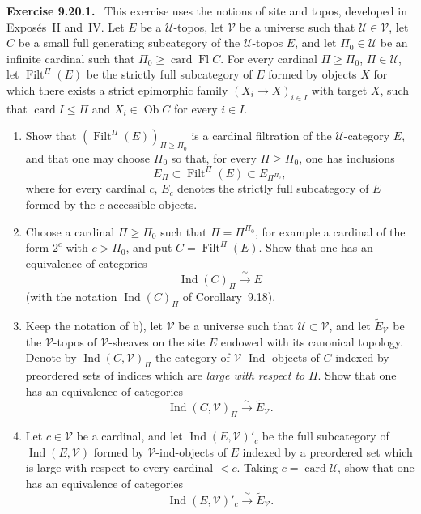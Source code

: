 \documentclass[11pt]{article}
\newcommand{\U}{\mathcal{U}}
\newcommand{\V}{\mathcal{V}}
\newcommand{\Ob}{\operatorname{Ob}}
\newcommand{\Ind}{\operatorname{Ind}}
\newcommand{\Filt}{\operatorname{Filt}}
\newcommand{\card}{\operatorname{card}}
\newcommand{\Fl}{\operatorname{Fl}}
\newenvironment{statement}[1]{\par\medskip\noindent\textbf{#1.}\ }{\par\medskip}
\begin{document}
\begin{statement}{Exercise 9.20.1}
This exercise uses the notions of site and topos, developed in Expos\'es~II and~IV. Let $E$ be a $\U$-topos, let $\V$ be a universe such that $\U\in\V$, let $C$ be a small full generating subcategory of the $\U$-topos $E$, and let $\Pi_0\in\U$ be an infinite cardinal such that $\Pi_0\geq\card \Fl C$. For every cardinal $\Pi\geq\Pi_0$, $\Pi\in\U$, let $\Filt^\Pi(E)$ be the strictly full subcategory of $E$ formed by objects $X$ for which there exists a strict epimorphic family $(X_i\to X)_{i\in I}$ with target $X$, such that $\card I\leq\Pi$ and $X_i\in\Ob C$ for every $i\in I$.
\begin{enumerate}[label=\alph*)]
\item Show that $(\Filt^\Pi(E))_{\Pi\geq\Pi_0}$ is a cardinal filtration of the $\U$-category $E$, and that one may choose $\Pi_0$ so that, for every $\Pi\geq\Pi_0$, one has inclusions
\[
 E_\Pi\subset \Filt^\Pi(E)\subset E_{\Pi^{\Pi_0}},
\]
where for every cardinal $c$, $E_c$ denotes the strictly full subcategory of $E$ formed by the $c$-accessible objects.

\item Choose a cardinal $\Pi\geq\Pi_0$ such that $\Pi=\Pi^{\Pi_0}$, for example a cardinal of the form $2^c$ with $c>\Pi_0$, and put $C=\Filt^\Pi(E)$. Show that one has an equivalence of categories
\[
 \Ind(C)_\Pi\xrightarrow{\ \sim\ } E
\]
(with the notation $\Ind(C)_\Pi$ of Corollary~9.18).

\item Keep the notation of b), let $\V$ be a universe such that $\U\subset\V$, and let $\widetilde E_{\V}$ be the $\V$-topos of $\V$-sheaves on the site $E$ endowed with its canonical topology. Denote by $\Ind(C,\V)_\Pi$ the category of $\V$-$\Ind$-objects of $C$ indexed by preordered sets of indices which are \emph{large with respect to} $\Pi$. Show that one has an equivalence of categories
\[
 \Ind(C,\V)_\Pi\xrightarrow{\ \sim\ }\widetilde E_{\V}.
\]

\item Let $c\in\V$ be a cardinal, and let $\Ind(E,\V)'_c$ be the full subcategory of $\Ind(E,\V)$ formed by $\V$-ind-objects of $E$ indexed by a preordered set which is large with respect to every cardinal $<c$. Taking $c=\card\U$, show that one has an equivalence of categories
\[
 \Ind(E,\V)'_c\xrightarrow{\ \sim\ }\widetilde E_{\V}.
\]
\end{enumerate}
\end{statement}
\end{document}
